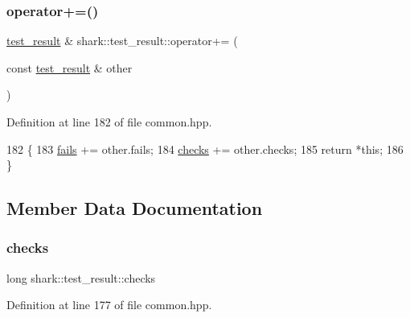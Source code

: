\subsubsection{\texorpdfstring{operator+=()}{operator+=()}}
{\footnotesize\ttfamily \hyperlink{structshark_1_1test__result}{test\+\_\+result} \& shark\+::test\+\_\+result\+::operator+= (\begin{DoxyParamCaption}\item[{const \hyperlink{structshark_1_1test__result}{test\+\_\+result} \&}]{other }\end{DoxyParamCaption})\hspace{0.3cm}{\ttfamily [inline]}}



Definition at line 182 of file common.\+hpp.


\begin{DoxyCode}
182                                                                         \{
183         \hyperlink{structshark_1_1test__result_ae113beda360d33cf4ae3ad104a965c88}{fails} += other.fails;
184         \hyperlink{structshark_1_1test__result_a246d092279ca7ba48d6723e1fe667291}{checks} += other.checks;
185         \textcolor{keywordflow}{return} *\textcolor{keyword}{this};
186     \}
\end{DoxyCode}


\subsection{Member Data Documentation}
\hypertarget{structshark_1_1test__result_a246d092279ca7ba48d6723e1fe667291}{}\label{structshark_1_1test__result_a246d092279ca7ba48d6723e1fe667291} 
\subsubsection{\texorpdfstring{checks}{checks}}
{\footnotesize\ttfamily long shark\+::test\+\_\+result\+::checks}



Definition at line 177 of file common.\+hpp.

\hypertarget{structshark_1_1test__result_ae113beda360d33cf4ae3ad104a965c88}{}\label{structshark_1_1test__result_ae113beda360d33cf4ae3ad104a965c88} 
